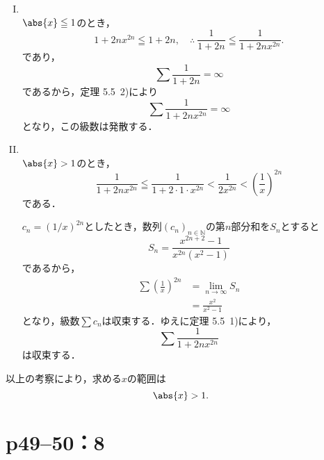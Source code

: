 \documentclass[a4paper,10pt,fleqn]{ltjsarticle}
\begin{document}
\begin{leftbar}
    \begin{enumerate}[(I)]
        \item \mbox{　} \\
              $\abs{x} \leqq 1$のとき，
              \[
                  1 + 2nx^{2n} \leqq 1+2n ,\quad \therefore ~ \frac{1}{1+2n} \leqq \frac{1}{1+2nx^{2n}}.
              \]
              であり，
              \[
                  \sum \frac{1}{1+2n} =\infty
              \]
              であるから，定理 5.5~2)により
              \[
                  \sum \frac{1}{1+2nx^{2n}} = \infty
              \]
              となり，この級数は発散する．
        \item \mbox{　}\\
              $\abs{x}>1$のとき，
              \[
                  \frac{1}{1+2n x^{2n}} \leqq \frac{1}{1+2 \cdot 1 \cdot x^{2n}} < \frac{1}{2x^{2n}} <\left( \frac{1}{x} \right)^{2n}
              \]
              である．

              $c_n = (1/x)^{2n}$としたとき，数列$(c_n)_{n \in \mathbb{N}}$の第$n$部分和を$S_n$とすると
              \[
                  S_n = \frac{x^{2n+2}-1}{x^{2n}(x^2-1)}
              \]
              であるから，
              \begin{align*}
                  \sum \left( \frac{1}{x} \right)^{2n} & =\lim_{n \to \infty} S_n \\
                                                       & = \frac{x^2}{x^2-1}
              \end{align*}
              となり，級数$\sum c_n$は収束する．ゆえに定理 5.5~1)により，
              \[
                  \sum \frac{1}{1+2nx^{2n}}
              \]
              は収束する．
    \end{enumerate}
    以上の考察により，求める$x$の範囲は
    \[
        \abs{x}>1.
    \]
\end{leftbar}

\newpage

\section*{p49--50：8}
\end{document}
